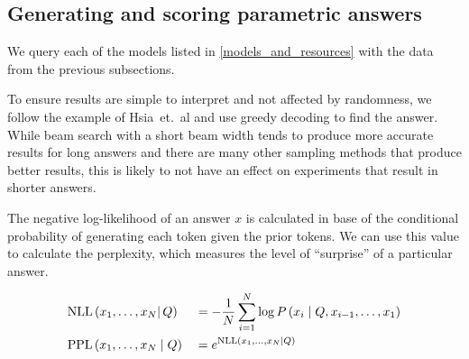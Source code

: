 
\subsection{Generating and scoring parametric answers}
\label{generating_and_scoring}

We query each of the models listed in \cref{models_and_resources} with the data from the previous subsections.

To ensure results are simple to interpret and not affected by randomness, we follow the example of Hsia~et.~al\cite{ragged} and use greedy decoding to find the answer.
While beam search with a short beam width tends to produce more accurate results for long answers\cite{sutskever_seq2seqlearning,wu_mltranslation} and there are many other sampling methods that produce better results\cite{text_degeneration}, this is likely to not have an effect on experiments that result in shorter answers\cite{t5}.

The negative log-likelihood of an answer $x$ is calculated in base of the conditional probability of generating each token given the prior tokens.
We can use this value to calculate the perplexity, which measures the level of ``surprise'' of a particular answer.

\begin{equation}
	\begin{aligned}
		&\text{NLL} \left( x_1, \dots, x_N \right | Q) &&= - \frac{1}{N} \sum^N_{i = 1} \log P \left( x_i \mid Q, x_{i - 1}, \dots, x_1 \right) \\
		&\text{PPL} \left( x_1, \dots, x_N \mid Q \right) &&= e^{\text{NLL} \left(x_1, \dots, x_N \mid Q \right)}
	\end{aligned}
\end{equation}

